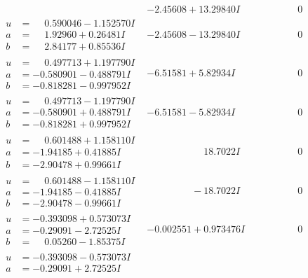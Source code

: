 \documentclass[1p]{elsarticle_modified}
\theoremstyle{definition}
\begin{document}
$$\begin{array}{c|c|c}
 & -2.45608 + 13.29840 I & \phantom{-0.000000 } 0 \\ \hline\begin{aligned}
u &= \phantom{-}0.590046 - 1.152570 I \\
a &= \phantom{-}1.92960 + 0.26481 I \\
b &= \phantom{-}2.84177 + 0.85536 I\end{aligned}
 & -2.45608 - 13.29840 I & \phantom{-0.000000 } 0 \\ \hline\begin{aligned}
u &= \phantom{-}0.497713 + 1.197790 I \\
a &= -0.580901 - 0.488791 I \\
b &= -0.818281 - 0.997952 I\end{aligned}
 & -6.51581 + 5.82934 I & \phantom{-0.000000 } 0 \\ \hline\begin{aligned}
u &= \phantom{-}0.497713 - 1.197790 I \\
a &= -0.580901 + 0.488791 I \\
b &= -0.818281 + 0.997952 I\end{aligned}
 & -6.51581 - 5.82934 I & \phantom{-0.000000 } 0 \\ \hline\begin{aligned}
u &= \phantom{-}0.601488 + 1.158110 I \\
a &= -1.94185 + 0.41885 I \\
b &= -2.90478 + 0.99661 I\end{aligned}
 & \phantom{-0.000000 -}18.7022 I & \phantom{-0.000000 } 0 \\ \hline\begin{aligned}
u &= \phantom{-}0.601488 - 1.158110 I \\
a &= -1.94185 - 0.41885 I \\
b &= -2.90478 - 0.99661 I\end{aligned}
 & \phantom{-0.000000 } -18.7022 I & \phantom{-0.000000 } 0 \\ \hline\begin{aligned}
u &= -0.393098 + 0.573073 I \\
a &= -0.29091 - 2.72525 I \\
b &= \phantom{-}0.05260 - 1.85375 I\end{aligned}
 & -0.002551 + 0.973476 I & \phantom{-0.000000 } 0 \\ \hline\begin{aligned}
u &= -0.393098 - 0.573073 I \\
a &= -0.29091 + 2.72525 I \\

\end{aligned}
\end{array}$$
\end{document}
